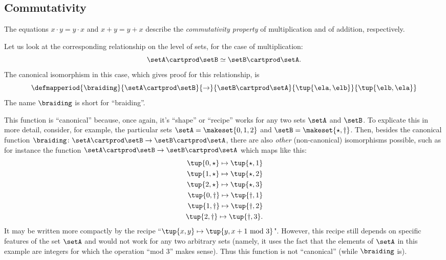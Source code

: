 \subsection{Commutativity}

The equations $x \cdot y = y \cdot x$ and $x + y = y + x$ describe the \emph{commutativity property} of multiplication and of addition, respectively.

Let us look at the corresponding relationship on the level of sets, for the case of multiplication:
\begin{equation}\label{eq:mult-commutativity-sets}
    \setA \cartprod \setB \simeq \setB \cartprod \setA.
\end{equation}
The canonical isomorphism in this case, which gives proof for this relationship, is
\begin{equation}\label{eq:braiding-sets}
    \defmapperiod{
        \braiding
    }{
        \setA \cartprod \setB
    }{
        \to
    }{
        \setB \cartprod \setA
    }{
        \tup{\ela, \elb}
    }{
        \tup{\elb, \ela}
    }
\end{equation}
The name $\braiding$ is short for ``braiding''.

This function is ``canonical'' because, once again, it's ``shape'' or ``recipe'' works for any two sets $\setA$ and $\setB$.
To explicate this in more detail, consider, for example, the particular sets $\setA = \makeset{0, 1, 2}$ and $\setB = \makeset{\star, \dagger}$.
Then, besides the canonical function $\braiding \colon \setA \cartprod \setB \to \setB \cartprod \setA$, there are also \emph{other} (non-canonical) isomorphisms possible, such as for instance the function $\setA \cartprod \setB \to \setB \cartprod \setA$ which maps like this:
\begin{align}\label{eq:noncanonical-braiding}
    \tup{0, \star} \mapsto \tup{\star, 1} \\
    \tup{1, \star} \mapsto \tup{\star, 2} \\
    \tup{2, \star} \mapsto \tup{\star, 3} \\
    \tup{0, \dagger} \mapsto \tup{\dagger, 1} \\
    \tup{1, \dagger} \mapsto \tup{\dagger, 2} \\
    \tup{2, \dagger} \mapsto \tup{\dagger, 3}.
\end{align}
It may be written more compactly by the recipe ``$\tup{x, y} \mapsto \tup{y, x +1 \text{ mod } 3}$".
However, this recipe still depends on specific features of the set $\setA$ and would not work for any two arbitrary sets (namely, it uses the fact that the elements of $\setA$ in this example are integers for which the operation ``mod 3'' makes sense).
Thus this function is not ``canonical'' (while $\braiding$ is).

